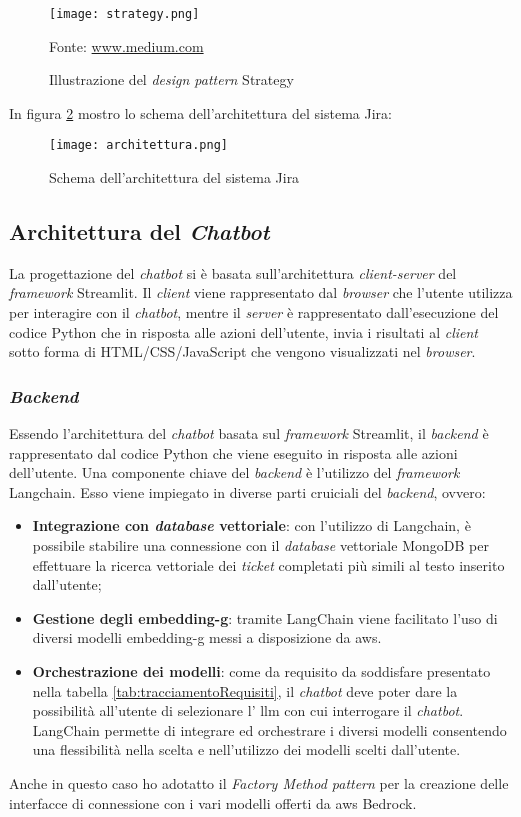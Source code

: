 \begin{figure}[H]
    \centering
    \texttt{[image: strategy.png]}
    \caption{Illustrazione del \textit{design pattern} Strategy}
    \small Fonte: \href{https://medium.com/litslink/design-patterns-strategy-in-examples-eae7bf10a817} {www.medium.com}
    \label{fig:strategy}
\end{figure}

\noindent
In figura \ref{fig:architetturaJira} mostro lo schema dell'architettura del sistema Jira:
\begin{figure}[H]
    \centering
    \texttt{[image: architettura.png]}
    \caption{Schema dell'architettura del sistema Jira}
    \label{fig:architetturaJira}
\end{figure}

\subsection{Architettura del \textit{Chatbot}}
La progettazione del \textit{chatbot} si è basata sull'architettura \textit{client-server} del \textit{framework} Streamlit. Il \textit{client} viene rappresentato dal \textit{browser} che l'utente utilizza per interagire con il \textit{chatbot}, mentre il \textit{server} è rappresentato dall'esecuzione del codice Python che in risposta alle azioni dell'utente, invia i risultati al \textit{client} sotto forma di HTML/CSS/JavaScript che vengono visualizzati nel \textit{browser}.
\subsubsection{\textit{Backend}}
Essendo l'architettura del \textit{chatbot} basata sul \textit{framework} Streamlit, il \textit{backend} è rappresentato dal codice Python che viene eseguito in risposta alle azioni dell'utente.
Una componente chiave del \textit{backend} è l'utilizzo del \textit{framework} Langchain. Esso viene impiegato in diverse parti cruiciali del \textit{backend}, ovvero:
\begin{itemize}
    \item \textbf{Integrazione con \textit{database} vettoriale}: con l'utilizzo di Langchain, è possibile stabilire una connessione con il \textit{database} vettoriale MongoDB per effettuare la ricerca vettoriale dei \textit{ticket} completati più simili al testo inserito dall'utente;
    \item \textbf{Gestione degli \gls{embedding-g}}: tramite LangChain viene facilitato l'uso di diversi modelli \gls{embedding-g} messi a disposizione da \gls{aws}. 
    \item \textbf{Orchestrazione dei modelli}: come da requisito da soddisfare presentato nella tabella \ref{tab:tracciamentoRequisiti}, il \textit{chatbot} deve poter dare la possibilità all'utente di selezionare l' \gls{llm} con cui interrogare il \textit{chatbot}. LangChain permette di integrare ed orchestrare i diversi modelli consentendo una flessibilità nella scelta e nell'utilizzo dei modelli scelti dall'utente.
\end{itemize} 
\noindent
Anche in questo caso ho adotatto il \textit{Factory Method pattern} per la creazione delle interfacce di connessione con i vari modelli offerti da \gls{aws} Bedrock. 
